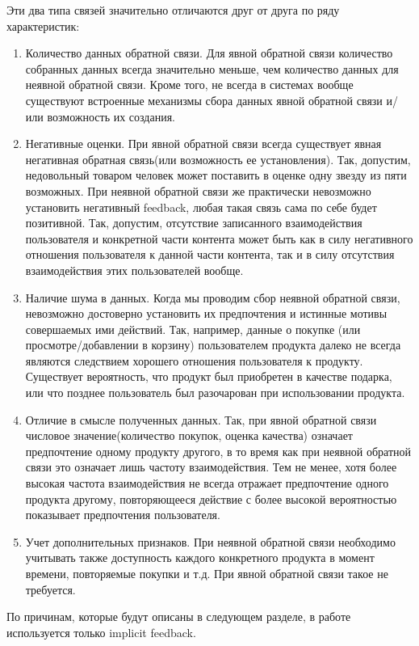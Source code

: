 \documentclass[14pt]{mmcs_article}
\newenvironment{myenumerate}
{ \begin{enumerate}
		\setlength{\itemsep}{0pt}
		\setlength{\parskip}{0pt}
		\setlength{\parsep}{0pt}     }
	{ \end{enumerate}                  }
\begin{document}
Эти два типа связей значительно отличаются друг от друга по ряду характеристик:
\begin{myenumerate}
	\item Количество данных обратной связи. Для явной обратной связи количество собранных данных всегда значительно меньше, чем количество данных для неявной обратной связи. Кроме того, не всегда в системах вообще существуют встроенные механизмы  сбора данных явной обратной связи и/или возможность их создания. 
	\item Негативные оценки. При явной обратной связи всегда существует явная негативная обратная связь(или возможность ее установления). Так, допустим, недовольный товаром человек может поставить в оценке одну звезду из пяти возможных. При неявной обратной связи же практически невозможно установить негативный feedback, любая такая связь сама по себе будет позитивной. Так, допустим, отсутствие записанного взаимодействия пользователя и конкретной части контента может быть как в силу негативного отношения пользователя к данной части контента, так и в силу отсутствия взаимодействия этих пользователей вообще.  
	\item Наличие шума в данных. Когда мы проводим сбор неявной обратной связи, невозможно достоверно установить их предпочтения и истинные мотивы совершаемых ими действий. Так, например, данные о покупке (или просмотре/добавлении в корзину) пользователем продукта далеко не всегда являются следствием хорошего отношения пользователя к продукту. Существует вероятность, что продукт был приобретен в качестве подарка, или что позднее пользователь был разочарован при использовании продукта.
	\item Отличие в смысле полученных данных. Так, при явной обратной связи числовое значение(количество покупок, оценка качества) означает предпочтение одному продукту другого, в то время как при неявной обратной связи это означает лишь частоту взаимодействия. Тем не менее, хотя более высокая частота взаимодействия не всегда отражает предпочтение одного продукта другому, повторяющееся действие с более высокой вероятностью показывает предпочтения пользователя.
	\item Учет дополнительных признаков. При неявной обратной связи необходимо учитывать также доступность каждого конкретного продукта в момент времени, повторяемые покупки и т.д. При явной обратной связи такое не требуется. 
\end{myenumerate}

По причинам, которые будут описаны в следующем разделе, в работе используется только implicit feedback.
\end{document}
